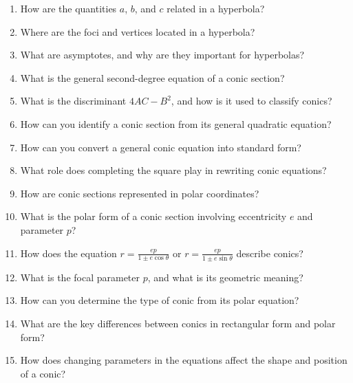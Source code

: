\begin{enumerate}
  \item How are the quantities \(a\), \(b\), and \(c\) related in a hyperbola?
  \item Where are the foci and vertices located in a hyperbola?
  \item What are asymptotes, and why are they important for hyperbolas?
  \item What is the general second-degree equation of a conic section?
  \item What is the discriminant \(4AC - B^{2}\), and how is it used to classify conics?
  \item How can you identify a conic section from its general quadratic equation?
  \item How can you convert a general conic equation into standard form?
  \item What role does completing the square play in rewriting conic equations?
  \item How are conic sections represented in polar coordinates?
  \item What is the polar form of a conic section involving eccentricity \(e\) and parameter \(p\)?
  \item How does the equation \(r = \frac{ep}{1 \pm e\cos\theta}\) or \(r = \frac{ep}{1 \pm e\sin\theta}\) describe conics?
  \item What is the focal parameter \(p\), and what is its geometric meaning?
  \item How can you determine the type of conic from its polar equation?
  \item What are the key differences between conics in rectangular form and polar form?
  \item How does changing parameters in the equations affect the shape and position of a conic?
\end{enumerate}
